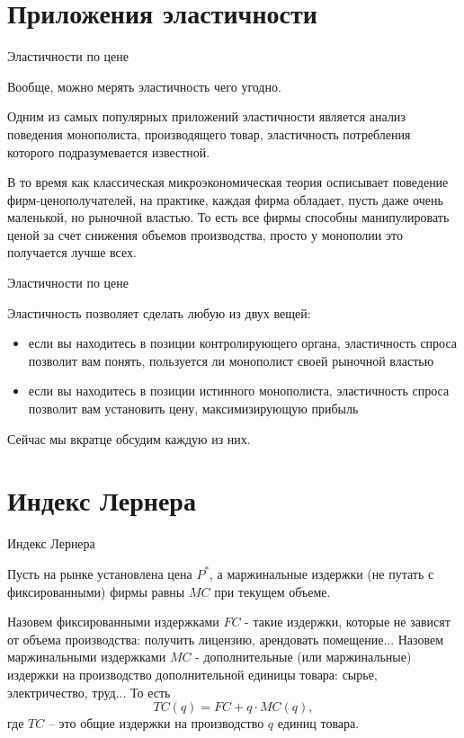 \documentclass{beamer}
\begin{document}
\section{Приложения эластичности}

\begin{frame}{Эластичности по цене}

Вообще, \alert{можно мерять эластичность чего угодно}.

Одним из самых популярных приложений эластичности является анализ поведения монополиста, производящего товар, эластичность потребления которого подразумевается известной.

В то время как классическая микроэкономическая теория осписывает поведение фирм-ценополучателей, на практике, каждая фирма обладает, пусть даже очень маленькой, но рыночной властью. То есть все фирмы способны манипулировать ценой за счет снижения объемов производства, просто у монополии это получается лучше всех.

\end{frame}

\begin{frame}{Эластичности по цене}

Эластичность позволяет сделать любую из двух вещей:

\begin{itemize}
\item если вы находитесь в позиции контролирующего органа, эластичность спроса позволит вам понять, пользуется ли монополист своей рыночной властью
\item если вы находитесь в позиции истинного монополиста, эластичность спроса позволит вам установить цену, максимизирующую прибыль
\end{itemize}

Сейчас мы вкратце обсудим каждую из них.

\end{frame}

\section{Индекс Лернера}

\begin{frame}{Индекс Лернера}

Пусть на рынке установлена цена $P^{\ast}$, а маржинальные издержки (не путать с фиксированными) фирмы равны $MC$ при текущем объеме.

Назовем \alert{фиксированными издержками} $FC$ - такие издержки, которые не зависят от объема производства: получить лицензию, арендовать помещение... Назовем \alert{маржинальными издержками} $MC$ - дополнительные (или маржинальные) издержки на производство дополнительной единицы товара: сырье, электричество, труд... То есть
$$ TC(q) = FC + q \cdot MC(q),$$
где $TC$ – это общие издержки на производство $q$ единиц товара.
\end{frame}
\end{document}
